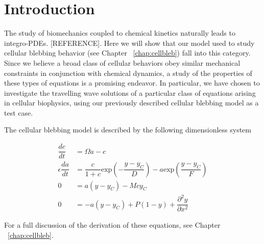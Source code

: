 \section{Introduction}

The study of biomechanics coupled to chemical kinetics naturally leads to integro-PDEs. [REFERENCE]. Here we will show that our model used to study cellular blebbing behavior (see Chapter ~\ref{chap:cellbleb}) fall into this category. Since we believe a broad class of cellular behaviors obey similar mechanical constraints in conjunction with chemical dynamics, a study of the properties of these types of equations is a promising endeavor. In particular, we have chosen to investigate the travelling wave solutions of a particular class of equations arising in cellular biophysics, using our previously described cellular blebbing model as a test case. 

The cellular blebbing model is described by the following dimensionless system

\begin{align}
\dfrac{dc}{dt}  & =  \Omega a - c\label{eq::nondimc}\\
\epsilon\dfrac{da}{ dt}  & =  \dfrac{c}{1+c} \mbox{exp}\left(-\dfrac{y-y_C}{D}\right) - a \mbox{exp} \left(\dfrac{y-y_C}{F} \right)\label{eq::nondima}\\
0 & = a(y-y_C) - Mcy_C\label{eq::nondimyC}\\
0 & = -a(y - y_C) + P (1-y) + \dfrac{\partial^2 y}{\partial x^2}\label{eq::nondimyM}
\end{align}

For a full discussion of the derivation of these equations, see Chapter ~\ref{chap:cellbleb}.


